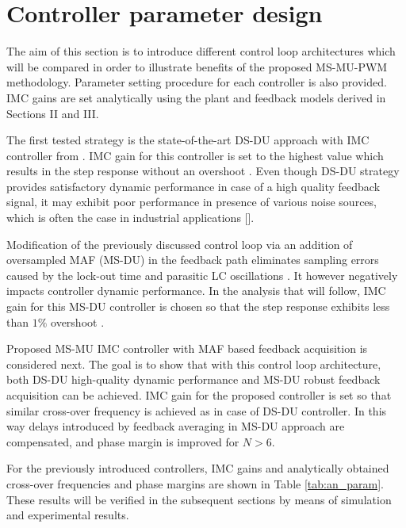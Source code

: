 \documentclass[journal]{IEEEtran}
\begin{document}
\section{Controller parameter design}
The aim of this section is to introduce different control loop architectures which will be compared in order to illustrate benefits of the proposed MS-MU-PWM methodology. Parameter setting procedure for each controller is also provided. IMC gains are set analytically using the plant and feedback models derived in Sections II and III. \par
The first tested strategy is the state-of-the-art DS-DU approach with IMC controller from \cite{vuksa2016}. IMC gain for this controller is set to the highest value which results in the step response without an overshoot \cite{vuksa2016}. Even though DS-DU strategy provides satisfactory dynamic performance in case of a high quality feedback signal, it may exhibit poor performance in presence of various noise sources, which is often the case in industrial applications [].  \par
Modification of the previously discussed control loop via an addition of oversampled MAF (MS-DU) in the feedback path eliminates sampling errors caused by the lock-out time and parasitic LC oscillations \cite{vuksa2016}. It however negatively impacts controller dynamic performance. In the analysis that will follow, IMC gain for this MS-DU controller is chosen so that the step response exhibits less than $1\%$ overshoot \cite{vuksa2016}. \par
Proposed MS-MU IMC controller with MAF based feedback acquisition is considered next. The goal is to show that with this control loop architecture, both DS-DU high-quality dynamic performance and MS-DU robust feedback acquisition can be achieved. IMC gain for the proposed controller is set so that similar cross-over frequency is achieved as in case of DS-DU controller. In this way delays introduced by feedback averaging in MS-DU approach are compensated, and phase margin is improved for $N>6$. \par
For the previously introduced controllers, IMC gains and analytically obtained cross-over frequencies and phase margins are shown in Table \ref{tab:an_param}. These results will be verified in the subsequent sections by means of simulation and experimental results.\par
\end{document}
